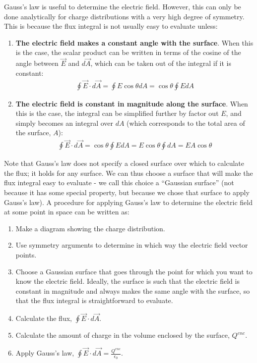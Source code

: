 \begin{chapterSummary}
Gauss's law is useful to determine the electric field. However, this can only be done analytically for charge distributions with a very high degree of symmetry. This is because the flux integral is not usually easy to evaluate unless:
\begin{enumerate}
\item \textbf{The electric field makes a constant angle with the surface}. When this is the case, the scalar product can be written in terms of the cosine of the angle between $\vec E$ and $d\vec A$, which can be taken out of the integral if it is constant:
\begin{align*}
\oint \vec E\cdot d\vec A=\oint E\cos\theta dA=\cos\theta\oint EdA
\end{align*}
\item \textbf{The electric field is constant in magnitude along the surface}. When this is the case, the integral can be simplified further by factor out $E$, and simply becomes an integral over $dA$ (which corresponds to the total area of the surface, $A$):
\begin{align*}
\oint \vec E\cdot d\vec A=\cos\theta\oint EdA =E\cos\theta\oint dA=EA\cos\theta 
\end{align*}
\end{enumerate}
Note that Gauss's law does not specify a closed surface over which to calculate the flux; it holds for any surface. We can thus choose a surface that will make the flux integral easy to evaluate - we call this choice a ``Gaussian surface'' (not because it has some special property, but because we chose that surface to apply Gauss's law). A procedure for applying Gauss's law to determine the electric field at some point in space can be written as:
\begin{enumerate}
\item Make a diagram showing the charge distribution.
\item Use symmetry arguments to determine in which way the electric field vector points.
\item Choose a Gaussian surface that goes through the point for which you want to know the electric field. Ideally, the surface is such that the electric field is constant in magnitude and always makes the same angle with the surface, so that the flux integral is straightforward to evaluate.
\item Calculate the flux, $\oint \vec E\cdot d\vec A$.
\item Calculate the amount of charge in the volume enclosed by the surface, $Q^{enc}$.
\item Apply Gauss's law, $\oint \vec E\cdot d\vec A=\frac{Q^{enc}}{\epsilon_0} $.

\end{enumerate}
\end{chapterSummary}

